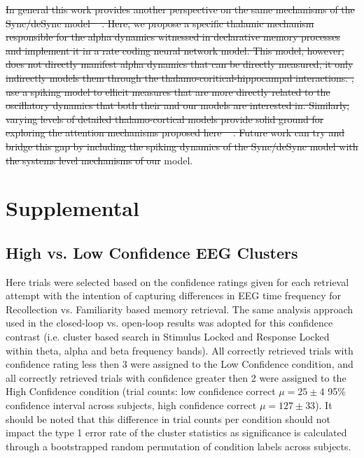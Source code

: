 \documentclass[11pt, titlepage, twoside]{article}
\providecommand{\DIFdel}[1]{{\protect\color{red}\sout{#1}}}                      %
\providecommand{\DIFdelend}{} %
\begin{document}
\DIFdel{In general this work provides another perspective on the same mechanisms of the Sync/deSync model \mbox{%
\cite{ParishHanslmayrBowman18}}%
.  Here, we propose a specific thalamic mechanism responsible for the alpha dynamics witnessed in declarative memory processes and implement it in a rate coding neural network model.  This model, however, does not directly manifest alpha dynamics that can be directly measured, it only indirectly models them through the thalamo-coritical-hippocampal interactions.  \textcite{ParishHanslmayrBowman18}, use a spiking model to ellicit measures that are more directly related to the oscillatory dynamics that both their and our models are interested in.  Similarly, varying levels of detailed thalamo-cortical models provide solid ground for exploring the attention mechanisms proposed here \mbox{%
\cite{HindriksvanPutten13,BeckerKnockRitterEtAl15}}%
.   Future work can try and bridge this gap by including the spiking dynamics of the Sync/deSync model with the systems level mechanisms of our }\DIFdelend model.  



\printbibliography


\section{Supplemental}\label{sec:supp}

\subsection{High vs. Low Confidence EEG Clusters}
\label{sec:deevEEGConf}
Here trials were selected based on the confidence ratings given for each retrieval attempt with the intention of capturing differences in EEG time frequency for Recollection vs. Familiarity based memory retrieval.  The same analysis approach used in the closed-loop vs. open-loop results was adopted for this confidence contrast (i.e. cluster based search in Stimulus Locked and Response Locked within theta, alpha and beta frequency bands).  All correctly retrieved trials with confidence rating less then 3 were assigned to the Low Confidence condition, and all correctly retrieved trials with confidence greater then 2 were assigned to the High Confidence condition (trial counts: low confidence correct $\mu=25\pm4$ 95\% confidence interval across subjects, high confidence correct $\mu=127\pm33$).  It should be noted that this difference in trial counts per condition should not impact the type 1 error rate of the cluster statistics as significance is calculated through a bootstrapped random permutation of condition labels across subjects.
\end{document}

